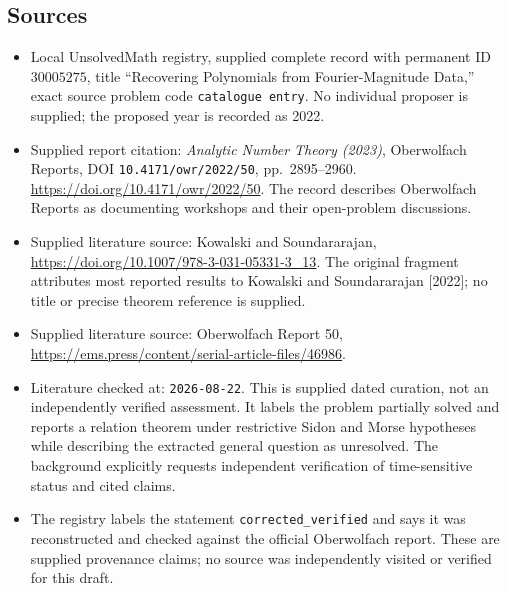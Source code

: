 \documentclass[11pt]{article}
\begin{document}
\subsection{Sources}
\begin{itemize}
\item Local UnsolvedMath registry, supplied complete record with permanent ID \(30005275\), title ``Recovering Polynomials from Fourier-Magnitude Data,'' exact source problem code \texttt{catalogue entry}. No individual proposer is supplied; the proposed year is recorded as 2022.
\item Supplied report citation: \emph{Analytic Number Theory (2023)}, Oberwolfach Reports, DOI \texttt{10.4171/owr/2022/50}, pp.\ 2895--2960. \url{https://doi.org/10.4171/owr/2022/50}. The record describes Oberwolfach Reports as documenting workshops and their open-problem discussions.
\item Supplied literature source: Kowalski and Soundararajan, \url{https://doi.org/10.1007/978-3-031-05331-3_13}. The original fragment attributes most reported results to Kowalski and Soundararajan [2022]; no title or precise theorem reference is supplied.
\item Supplied literature source: Oberwolfach Report 50, \url{https://ems.press/content/serial-article-files/46986}.
\item Literature checked at: \texttt{2026-08-22}. This is supplied dated curation, not an independently verified assessment. It labels the problem partially solved and reports a relation theorem under restrictive Sidon and Morse hypotheses while describing the extracted general question as unresolved. The background explicitly requests independent verification of time-sensitive status and cited claims.
\item The registry labels the statement \texttt{corrected\_verified} and says it was reconstructed and checked against the official Oberwolfach report. These are supplied provenance claims; no source was independently visited or verified for this draft.
\end{itemize}
\end{document}
